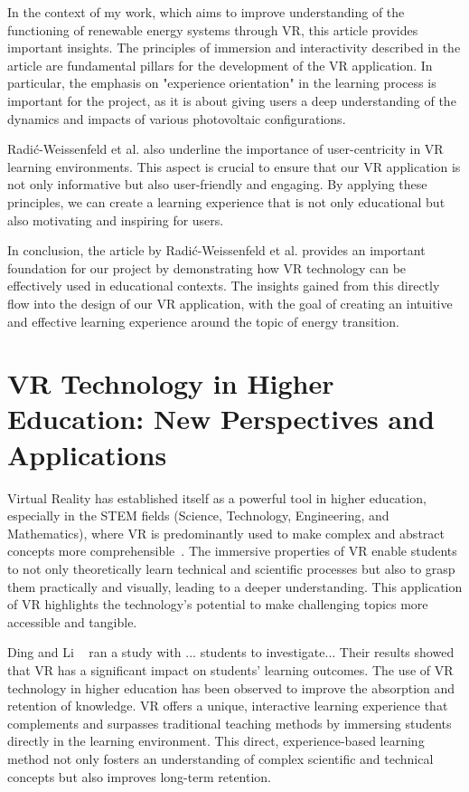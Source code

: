 \documentclass[draft, final]{vutinfth} %
\begin{document}
In the context of my work, which aims to improve understanding of the functioning of renewable energy systems through VR, this article provides important insights. The principles of immersion and interactivity described in the article are fundamental pillars for the development of the VR application. In particular, the emphasis on "experience orientation" in the learning process is important for the project, as it is about giving users a deep understanding of the dynamics and impacts of various photovoltaic configurations.

Radić-Weissenfeld et al. also underline the importance of user-centricity in VR learning environments. This aspect is crucial to ensure that our VR application is not only informative but also user-friendly and engaging. By applying these principles, we can create a learning experience that is not only educational but also motivating and inspiring for users.

In conclusion, the article by Radić-Weissenfeld et al. provides an important foundation for our project by demonstrating how VR technology can be effectively used in educational contexts. The insights gained from this directly flow into the design of our VR application, with the goal of creating an intuitive and effective learning experience around the topic of energy transition.

\section{VR Technology in Higher Education: New Perspectives and Applications}

Virtual Reality has established itself as a powerful tool in higher education, especially in the STEM fields (Science, Technology, Engineering, and Mathematics), where VR is predominantly used to make complex and abstract concepts more comprehensible~\cite{ding2022review}. The immersive properties of VR enable students to not only theoretically learn technical and scientific processes but also to grasp them practically and visually, leading to a deeper understanding. This application of VR highlights the technology's potential to make challenging topics more accessible and tangible.

Ding and Li ~\cite{ding2022review} ran a study with ... students to investigate... Their results showed that VR has a significant impact on students' learning outcomes. The use of VR technology in higher education has been observed to improve the absorption and retention of knowledge. VR offers a unique, interactive learning experience that complements and surpasses traditional teaching methods by immersing students directly in the learning environment. This direct, experience-based learning method not only fosters an understanding of complex scientific and technical concepts but also improves long-term retention.
\end{document}
